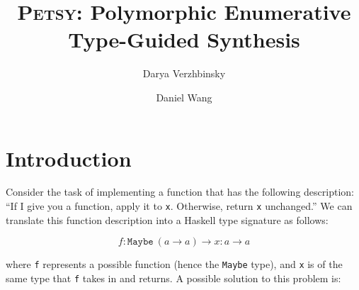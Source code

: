 \documentclass[acmsmall,nonacm]{acmart}
\begin{document}
\title{\textsc{Petsy}: Polymorphic Enumerative Type-Guided Synthesis}

\author{Darya Verzhbinsky}

\author{Daniel Wang}

\maketitle

\section{Introduction}


Consider the task of implementing a function that has the following 
description: “If I give you a function, apply it to \verb|x|. Otherwise, 
return \verb|x| unchanged.” We can translate this function description 
into a Haskell type signature as follows: 

\begin{equation}
  \label{query1}
  f:\texttt{Maybe}~(a \to a) \to x:a \to a
\end{equation}


\noindent where \verb|f| represents a possible function (hence the \verb|Maybe| type), and 
\verb|x| is of the same type that \verb|f| takes in and returns. A possible 
solution to this problem is:
\end{document}
